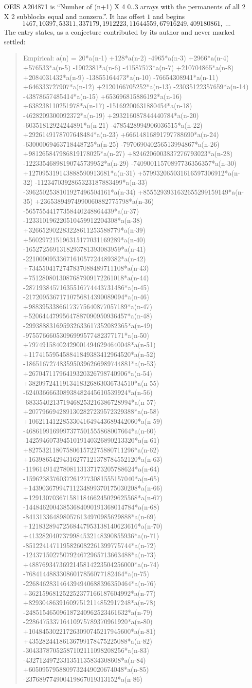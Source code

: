 \documentclass[11pt,a4paper]{article}
\theoremstyle{plain}
\theoremstyle{definition}
\begin{document}
OEIS A204871 is ``Number of (n+1) X 4 0..3 arrays with the permanents of all 2 X 2 subblocks equal and nonzero.''. It has offset $1$ and begins
\[
1467, 10397, 53311, 337179, 1912223, 11644559, 67916249, 409180861,\ \dots
\]
The entry states, as a conjecture contributed by its author and never marked settled:
\begin{quote}
Empirical: a(n) = 20*a(n-1) +128*a(n-2) -4965*a(n-3) +2966*a(n-4) +576533*a(n-5) -1902381*a(n-6) -41587573*a(n-7) +210704865*a(n-8) +2084031432*a(n-9) -13855164473*a(n-10) -76654308941*a(n-11) +646333727907*a(n-12) +2120166705252*a(n-13) -23035122357659*a(n-14) -43878657485414*a(n-15) +653696815886192*a(n-16) +638238110251978*a(n-17) -15169200631880454*a(n-18) -4628209300092372*a(n-19) +293216087844440784*a(n-20) -60351812924244891*a(n-21) -4785428994906036515*a(n-22) +2926149178707648484*a(n-23) +66614816891797788690*a(n-24) -63000069463718448725*a(n-25) -797069040256513994867*a(n-26) +981265847986819178025*a(n-27) +8246206003837276793023*a(n-28) -12233546898190745739952*a(n-29) -74090011570897736356357*a(n-30) +127095319143888590913681*a(n-31) +579932065031616597306912*a(n-32) -1123470392865323187883499*a(n-33) -3962502538101927496504161*a(n-34) +8555293931632655299159149*a(n-35) +23653894974990060882775798*a(n-36) -56575544177358440248864439*a(n-37) -123310196220510459912204308*a(n-38) +326652902283228611253588779*a(n-39) +560297215196315177031169289*a(n-40) -1652725691318293781393083959*a(n-41) -2210090953367161057724489382*a(n-42) +7345504172747837088489711108*a(n-43) +7512808013087687909172261018*a(n-44) -28719384571635516774443731486*a(n-45) -21720953671710756814390089094*a(n-46) +98839533866173775640877057189*a(n-47) +52064447995647887090950936457*a(n-48) -299388831695932633617352082365*a(n-49) -97557666053096999577482377171*a(n-50) +797491584024290014946294640048*a(n-51) +117415595458841849383412964520*a(n-52) -1865167274835950396266989744881*a(n-53) +26704711796419320326798740906*a(n-54) +3820972411913418326863036734510*a(n-55) -624036666308938482445610539924*a(n-56) -6833540213719468253216386728994*a(n-57) +2077966942891302827239572329388*a(n-58) +10621141228533041649443689442060*a(n-59) -4686199169997377501555868007664*a(n-60) -14259460739451019140326890213320*a(n-61) +8275321180758061572275880711296*a(n-62) +16398654294316277121378784552120*a(n-63) -11961491427808113137173205788624*a(n-64) -15962383760372612773081555157040*a(n-65) +14390367994711234899370175030208*a(n-66) +12913070367158118466245029625568*a(n-67) -14484620043853684090191368014784*a(n-68) -8413133648980576134970985629888*a(n-69) +12183289472568447953138140623616*a(n-70) +4132820407379984532148390855936*a(n-71) -8512241471195826082261399775744*a(n-72) -1243715027507924672965713663488*a(n-73) +4887693473692145814223504256000*a(n-74) -76841448833086017856077182464*a(n-75) -2268462831464394940688396350464*a(n-76) +362159681252252377166187604992*a(n-77) +829304863916097512114852917248*a(n-78) -248515465096187240962523461632*a(n-79) -228647533716410975789370961920*a(n-80) +104845302217263090745217945600*a(n-81) +43528244186136799178475225088*a(n-82) -30433787052587102111098208256*a(n-83) -4327124972331351135834308608*a(n-84) +6050957958809732449020674048*a(n-85) -237689774900419867019313152*a(n-86) 
\end{quote}
\end{document}
